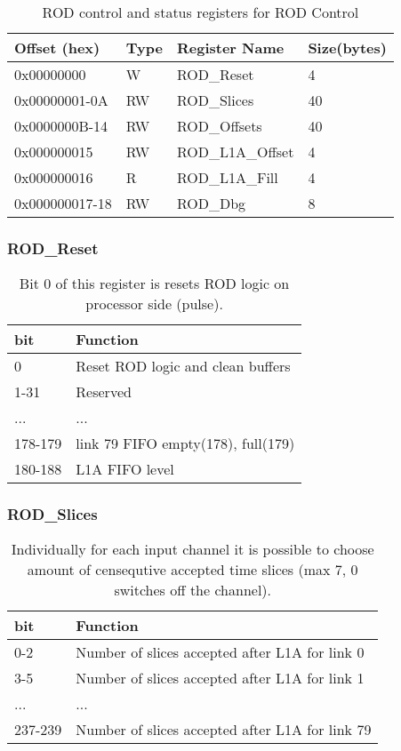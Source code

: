 \begin {table}[H]
\begin{center}
\caption {ROD control and status registers for ROD Control}
\label{rod_control_run}
\begin{tabular}{|l|l|l|l|}
\hline
Offset (hex)& Type & Register Name & Size(bytes)\\
\hline
0x00000000 & W & ROD\_Reset & 4 \\
\hline
0x00000001-0A & RW & ROD\_Slices & 40 \\
\hline
0x0000000B-14 & RW & ROD\_Offsets & 40 \\
\hline
0x000000015 & RW & ROD\_L1A\_Offset & 4 \\
\hline
0x000000016 & R & ROD\_L1A\_Fill & 4 \\
\hline
0x000000017-18 & RW & ROD\_Dbg & 8 \\
\hline
\end{tabular}
\end{center}
\end{table}


\subsubsection{ROD\_Reset}
\begin {table}[H]
\begin{center}
\begin{tabular}{|l|l|}
\hline
\textbf{bit} & \textbf{Function} \\
\hline
0 & Reset ROD logic and clean buffers \\ \hline
1-31 & Reserved \\ \hline
... & ...\\ \hline
178-179 & link 79 FIFO empty(178), full(179)\\ \hline
180-188 & L1A FIFO level\\ \hline
\end{tabular}
\caption{Bit 0 of this register is resets ROD logic on processor side (pulse).}
\end{center}
\end{table}

\subsubsection{ROD\_Slices}
\begin {table}[H]
\begin{center}
\begin{tabular}{|l|l|}
\hline
\textbf{bit} & \textbf{Function} \\
\hline
0-2 & Number of slices accepted after L1A for link 0 \\ \hline
3-5 & Number of slices accepted after L1A for link 1 \\ \hline
... & ...\\ \hline
237-239 & Number of slices accepted after L1A for link 79 \\ \hline
\end{tabular}
\caption{Individually for each input channel it is possible to choose amount of censequtive accepted time slices (max 7, 0 switches off the channel).}
\end{center}
\end{table}

